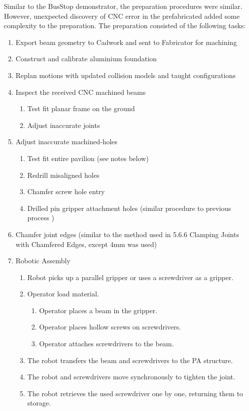 Similar to the BusStop demonstrator, the preparation procedures were similar. However, unexpected discovery of CNC error in the prefabricated added some complexity to the preparation. The preparation consisted of the following tasks:
\begin{enumerate}
    \item Export beam geometry to Cadwork and sent to Fabricator for machining
    \item Construct and calibrate aluminium foundation
    \item Replan motions with updated collision models and taught configurations
    \item Inspect the received CNC machined beams
    \begin{enumerate}
        \item Test fit planar frame on the ground
        \item Adjust inaccurate joints 
    \end{enumerate}
    \item Adjust inaccurate machined-holes 
    \begin{enumerate}
        \item Test fit entire pavilion (see notes below)
        \item Redrill misaligned holes
        \item Chamfer screw hole entry
        \item Drilled pin gripper attachment holes (similar procedure to previous process )
    \end{enumerate}
    \item Chamfer joint edges (similar to the method used in 5.6.6 Clamping Joints with Chamfered Edges, except 4mm was used)
    \item Robotic Assembly 
    \begin{enumerate}
        \item Robot picks up a parallel gripper or uses a screwdriver as a gripper.
        \item Operator load material.
        \begin{enumerate}
            \item Operator places a beam in the gripper.
            \item Operator places hollow screws on screwdrivers.
            \item Operator attaches screwdrivers to the beam.
        \end{enumerate}
        \item The robot transfers the beam and screwdrivers to the PA structure.
        \item The robot and screwdrivers move synchronously to tighten the joint.
        \item The robot retrieves the used screwdriver one by one, returning them to storage.
    \end{enumerate}
\end{enumerate}

